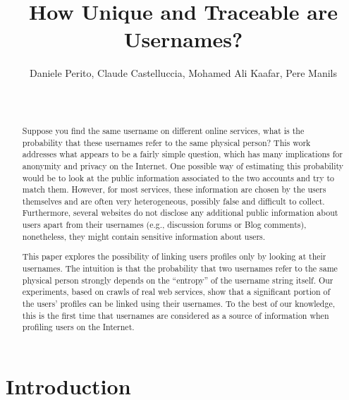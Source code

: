 \documentclass[letterpaper]{sig-alternate}
\begin{document}
\title{How Unique and Traceable are Usernames?}
\author{
\alignauthor
Daniele Perito, Claude Castelluccia, Mohamed Ali Kaafar, Pere Manils\\
  \\
  \\
\alignauthor
}

\maketitle

\begin{abstract}

Suppose you find the same username on different online services, what is the
probability that these usernames refer to the same physical person?  This work
addresses what appears to be a fairly simple question, which has many
implications for anonymity and privacy on the Internet.  One possible way of
estimating this probability would be to look at the public information
associated to the two accounts and try to match them. However, for most
services, these information are chosen by the users themselves and are often
very heterogeneous, possibly false and difficult to collect. Furthermore,
several websites do not disclose any additional public information about users
apart from their usernames (e.g., discussion forums or Blog comments),
nonetheless, they might contain sensitive information about users.

This paper explores the possibility of linking users profiles only by looking
at their usernames.  The intuition is that the probability that two usernames
refer to the same physical person strongly depends on the ``entropy'' of the
username string itself.  Our experiments, based on crawls of real web services,
show that a significant portion of the users' profiles can be linked using
their usernames.  To the best of our knowledge, this is the first time that
usernames are considered as a source of information when profiling users on the
Internet.




\end{abstract}



\section{Introduction}
\end{document}
